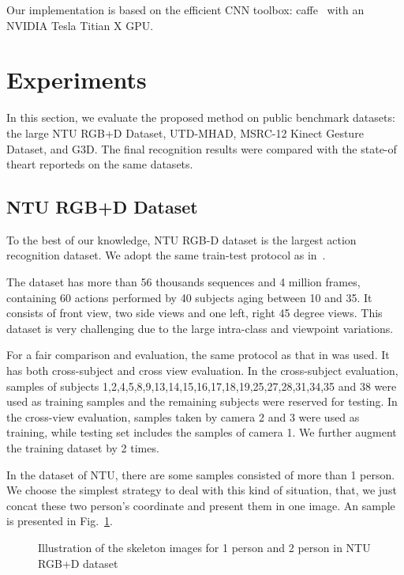 \documentclass[10pt,journal]{IEEEtran}
\begin{document}
Our implementation is based on the efficient CNN toolbox: caffe~\cite{Jia2014Caffe} with an NVIDIA Tesla Titian X GPU.

\section{Experiments}
\label{experiments}
In this section, we evaluate the proposed method on public benchmark datasets: the large NTU RGB+D Dataset, UTD-MHAD, MSRC-12 Kinect Gesture Dataset, and G3D. The final recognition results were compared with the state-of theart reporteds on the same datasets. 

\subsection{NTU RGB+D Dataset}	
To the best of our knowledge, NTU RGB-D dataset \cite{Shahroudy2016NTU} is the largest action recognition dataset. We adopt the same train-test  protocol as in~\cite{Wang2016Action}.

The dataset has more than 56 thousands sequences and 4 million frames, containing 60 actions performed by 40 subjects aging between 10 and 35. It consists of front view, two side views and one left, right 45 degree views. This dataset is very challenging due to the large intra-class and viewpoint variations.

For a fair comparison and evaluation, the same protocol as that in \cite{Shahroudy2016NTU} was used. It has both cross-subject and cross view evaluation. In the cross-subject evaluation, samples of subjects 1,2,4,5,8,9,13,14,15,16,17,18,19,25,27,28,31,34,35 and 38 were used as training samples and the remaining subjects were reserved for testing. In the cross-view evaluation, samples taken by camera 2 and 3 were used as training, while testing set includes the samples of camera 1. We further augment the training dataset by 2 times. 

In the dataset of NTU, there are some samples consisted of more than 1 person. We choose the simplest strategy to deal with this kind of situation, that, we just concat these two person's coordinate and present them in one image. An sample is presented in Fig.~\ref{fig:NTUmap}.

\begin{figure}[htb]
\centering
{}
\caption{Illustration of the skeleton images for 1 person and 2 person in NTU RGB+D dataset}
\label{fig:NTUmap}
\end{figure}
\end{document}
